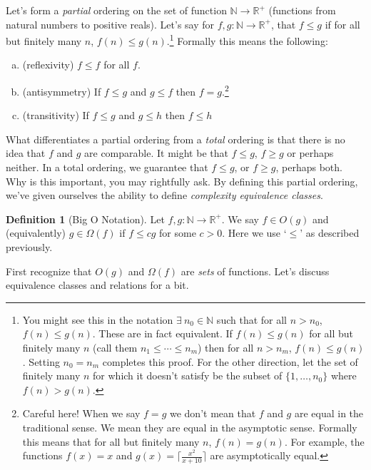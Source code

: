 \documentclass[10pt]{article}
\theoremstyle{plain}
\theoremstyle{definition}
\newtheorem{defn}[thm]{Definition} %
\newcommand{\NN}{\mathbb{N}}
\newcommand{\RR}{\mathbb{R}}
\numberwithin{equation}{section}
\numberwithin{figure}{section}
\begin{document}
\noindent Let's form a \emph{partial} ordering on the set of function $\NN \rightarrow \RR^+$ (functions from natural numbers to positive reals). Let's say for $f, g : \NN \rightarrow \RR^+$, that $f \leq g$ if for all but finitely many $n$, $f(n) \leq g(n)$.\footnote{You might see this in the notation $\exists \ n_0 \in \NN$ such that for all $n > n_0$, $f(n) \leq g(n)$. These are in fact equivalent. If $f(n) \leq g(n)$ for all but finitely many $n$ (call them $n_1 \leq \cdots \leq n_m$) then for all $n > n_m$, $f(n) \leq g(n)$. Setting $n_0 = n_m$ completes this proof. For the other direction, let the set of finitely many $n$ for which it doesn't satisfy be the subset of $\{1, \ldots, n_0\}$ where $f(n) > g(n)$.} Formally this means the following:
\begin{enumerate}[(a)]
\item (reflexivity) $f \leq f$ for all $f$.
\item (antisymmetry) If $f \leq g$ and $g \leq f$ then $f = g$.\footnote{Careful here! When we say $f = g$ we don't mean that $f$ and $g$ are equal in the traditional sense. We mean they are equal in the asymptotic sense. Formally this means that for all but finitely many $n$, $f(n) = g(n)$. For example, the functions $f(x) = x$ and $g(x) = \lceil \frac{x^2}{x + 10} \rceil$ are asymptotically equal.}
\item (transitivity) If $f \leq g$ and $g \leq h$ then $f \leq h$ 
\end{enumerate}
What differentiates a partial ordering from a \emph{total} ordering is that there is no idea that $f$ and $g$ are comparable. It might be that $f \leq g$, $f \geq g$ or perhaps neither. In a total ordering, we guarantee that $f \leq g$, or $f \geq g$, perhaps both. \\

\noindent Why is this important, you may rightfully ask. By defining this partial ordering, we've given ourselves the ability to define \emph{complexity equivalence classes}. 

\begin{framed}
\begin{defn}[Big O Notation]
Let $f, g : \NN \rightarrow \RR^+$. We say $f \in O(g)$ and (equivalently) $g \in \Omega(f)$ if $f \leq c g$ for some $c > 0$. Here we use `$\leq$' as described previously.
\end{defn}
\end{framed}

\noindent First recognize that $O(g)$ and $\Omega(f)$ are \emph{sets} of functions. Let's discuss equivalence classes and relations for a bit.
\end{document}
